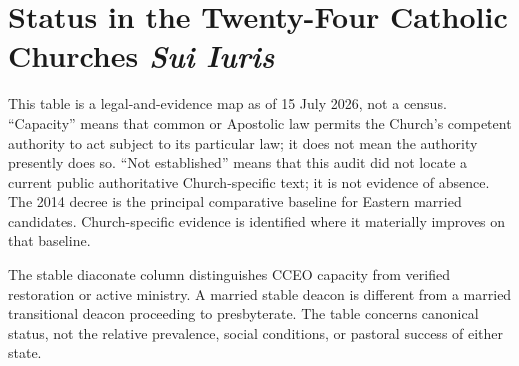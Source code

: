\section{Status in the Twenty-Four Catholic Churches \emph{Sui Iuris}}

This table is a legal-and-evidence map as of 15 July 2026, not a census. ``Capacity'' means that common or Apostolic law permits the Church's competent authority to act subject to its particular law; it does not mean the authority presently does so. ``Not established'' means that this audit did not locate a current public authoritative Church-specific text; it is not evidence of absence. The 2014 decree is the principal comparative baseline for Eastern married candidates. Church-specific evidence is identified where it materially improves on that baseline.

The stable diaconate column distinguishes CCEO capacity from verified restoration or active ministry. A married stable deacon is different from a married transitional deacon proceeding to presbyterate. The table concerns canonical status, not the relative prevalence, social conditions, or pastoral success of either state.

